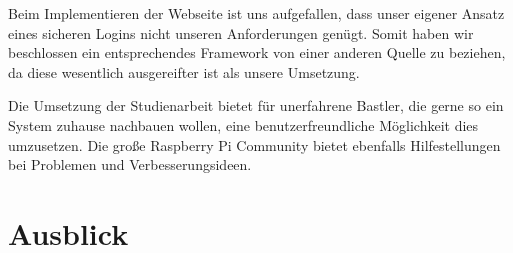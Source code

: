 	Beim Implementieren der Webseite ist uns aufgefallen, dass unser eigener Ansatz eines sicheren Logins nicht unseren Anforderungen genügt. Somit haben wir beschlossen ein entsprechendes Framework von einer anderen Quelle zu beziehen, da diese wesentlich ausgereifter ist als unsere Umsetzung. 
	
	Die Umsetzung der Studienarbeit bietet für unerfahrene Bastler, die gerne so ein System zuhause nachbauen wollen, eine benutzerfreundliche Möglichkeit dies umzusetzen. Die große Raspberry Pi Community bietet ebenfalls Hilfestellungen bei Problemen und Verbesserungsideen.
	
\section{Ausblick}
	
